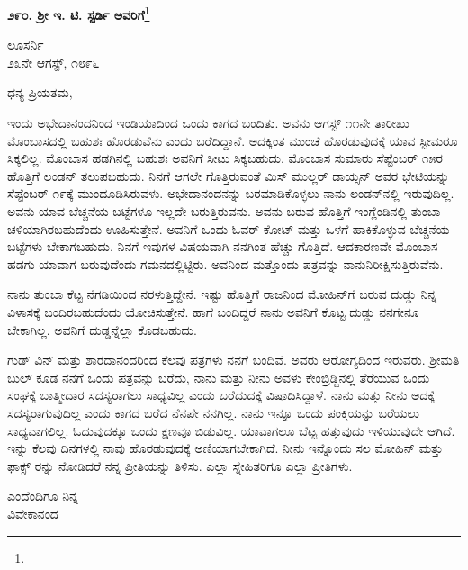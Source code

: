\begin{center}
\textbf{೨೯೦. ಶ‍್ರೀ ಇ. ಟಿ. ಸ್ಟರ್ಡಿ ಅವರಿಗೆ}\footnote{}
\end{center}


\vspace{-0.5cm}

\begin{flushright}
ಲೂಸರ್ನಿ\\೨೩ನೇ ಆಗಸ್ಟ್, ೧೮೯೬
\end{flushright}

\vspace{-0.45cm}

\noindent
ಧನ್ಯ ಪ್ರಿಯತಮ,

ಇಂದು ಅಭೇದಾನಂದನಿಂದ ಇಂಡಿಯಾದಿಂದ ಒಂದು ಕಾಗದ ಬಂದಿತು. ಅವನು ಆಗಸ್ಟ್ ೧೧ನೇ ತಾರೀಖು  ಮೊಂಬಾಸದಲ್ಲಿ ಬಹುಶಃ ಹೊರಡುವೆನು ಎಂದು ಬರೆದಿದ್ದಾನೆ. ಅದಕ್ಕಿಂತ ಮುಂಚೆ ಹೊರಡುವುದಕ್ಕೆ ಯಾವ ಸ್ಟೀಮರೂ ಸಿಕ್ಕಲಿಲ್ಲ. ಮೊಂಬಾಸ ಹಡಗಿನಲ್ಲಿ ಬಹುಶಃ ಅವನಿಗೆ ಸೀಟು ಸಿಕ್ಕಬಹುದು. ಮೊಂಬಾಸ ಸುಮಾರು ಸೆಪ್ಟೆಂಬರ್ ೧೫ರ ಹೊತ್ತಿಗೆ ಲಂಡನ್ ತಲುಪಬಹುದು. ನಿನಗೆ ಆಗಲೇ ಗೊತ್ತಿರುವಂತೆ ಮಿಸ್ ಮುಲ್ಲರ್ ಡಾಯ್ಸನ್ ಅವರ ಭೇಟಿಯನ್ನು ಸೆಪ್ಟೆಂಬರ್ ೧೯ಕ್ಕೆ ಮುಂದೂಡಿಸಿರುವಳು. ಅಭೇದಾನಂದನನ್ನು ಬರಮಾಡಿಕೊಳ್ಳಲು ನಾನು ಲಂಡನ್‌ನಲ್ಲಿ ಇರುವುದಿಲ್ಲ. ಅವನು ಯಾವ ಬೆಚ್ಚನೆಯ ಬಟ್ಟೆಗಳೂ ಇಲ್ಲದೇ ಬರುತ್ತಿರುವನು. ಅವನು ಬರುವ ಹೊತ್ತಿಗೆ ಇಂಗ್ಲೆಂಡಿನಲ್ಲಿ ತುಂಬಾ ಚಳಿಯಾಗಿರಬಹುದೆಂದು ಊಹಿಸುತ್ತೇನೆ. ಅವನಿಗೆ ಒಂದು ಓವರ್ ಕೋಟ್ ಮತ್ತು ಒಳಗೆ ಹಾಕಿಕೊಳ್ಳುವ ಬೆಚ್ಚನೆಯ ಬಟ್ಟೆಗಳು ಬೇಕಾಗಬಹುದು. ನಿನಗೆ ಇವುಗಳ ವಿಷಯವಾಗಿ ನನಗಿಂತ ಹೆಚ್ಚು ಗೊತ್ತಿದೆ. ಆದಕಾರಣವೇ ಮೊಂಬಾಸ ಹಡಗು ಯಾವಾಗ ಬರುವುದೆಂದು ಗಮನದಲ್ಲಿಟ್ಟಿರು. ಅವನಿಂದ ಮತ್ತೊಂದು ಪತ್ರವನ್ನು ನಾನುನಿರೀಕ್ಷಿಸುತ್ತಿರುವೆನು.

ನಾನು ತುಂಬಾ ಕೆಟ್ಟ ನೆಗಡಿಯಿಂದ ನರಳುತ್ತಿದ್ದೇನೆ. ಇಷ್ಟು ಹೊತ್ತಿಗೆ ರಾಜನಿಂದ ಮೋಹಿನ್‌ಗೆ ಬರುವ ದುಡ್ಡು ನಿನ್ನ ವಿಳಾಸಕ್ಕೆ ಬಂದಿರಬಹುದೆಂದು ಯೋಚಿಸುತ್ತೇನೆ. ಹಾಗೆ ಬಂದಿದ್ದರೆ ನಾನು ಅವನಿಗೆ ಕೊಟ್ಟ ದುಡ್ಡು ನನಗೇನೂ ಬೇಕಾಗಿಲ್ಲ. ಅವನಿಗೆ ದುಡ್ಡನ್ನೆಲ್ಲಾ ಕೊಡಬಹುದು.

ಗುಡ್ ವಿನ್ ಮತ್ತು ಶಾರದಾನಂದರಿಂದ ಕೆಲವು ಪತ್ರಗಳು ನನಗೆ ಬಂದಿವೆ. ಅವರು ಆರೋಗ್ಯದಿಂದ ಇರುವರು. ಶ‍್ರೀಮತಿ ಬುಲ್ ಕೂಡ ನನಗೆ ಒಂದು ಪತ್ರವನ್ನು ಬರೆದು, ನಾನು ಮತ್ತು ನೀನು ಅವಳು ಕೇಂಬ್ರಿಡ್ಜಿನಲ್ಲಿ ತೆರೆಯುವ ಒಂದು ಸಂಘಕ್ಕೆ ಬಾತ್ಮೀದಾರ ಸದಸ್ಯರಾಗಲು ಸಾಧ್ಯವಿಲ್ಲ ಎಂದು ಬರೆದುದಕ್ಕೆ ವಿಷಾದಿಸಿದ್ದಾಳೆ. ನಾನು ಮತ್ತು ನೀನು ಅದಕ್ಕೆ ಸದಸ್ಯರಾಗುವುದಿಲ್ಲ ಎಂದು ಕಾಗದ ಬರೆದ ನೆನಪೇ ನನಗಿಲ್ಲ. ನಾನು ಇನ್ನೂ ಒಂದು ಪಂಕ್ತಿಯನ್ನು ಬರೆಯಲು ಸಾಧ್ಯವಾಗಲಿಲ್ಲ. ಓದುವುದಕ್ಕೂ ಒಂದು ಕ್ಷಣವೂ ಬಿಡುವಿಲ್ಲ. ಯಾವಾಗಲೂ ಬೆಟ್ಟ ಹತ್ತುವುದು ಇಳಿಯುವುದೇ ಆಗಿದೆ. ಇನ್ನು ಕೆಲವು ದಿನಗಳಲ್ಲಿ ನಾವು ಹೊರಡುವುದಕ್ಕೆ ಅಣಿಯಾಗಬೇಕಾಗಿದೆ. ನೀನು ಇನ್ನೊಂದು ಸಲ ಮೋಹಿನ್ ಮತ್ತು ಫಾಕ್ಸ್ ರನ್ನು ನೋಡಿದರೆ ನನ್ನ ಪ್ರೀತಿಯನ್ನು ತಿಳಿಸು. ಎಲ್ಲಾ ಸ್ನೇಹಿತರಿಗೂ ಎಲ್ಲಾ ಪ್ರೀತಿಗಳು.

\vspace{-0.4cm}

{\flushright
ಎಂದೆಂದಿಗೂ ನಿನ್ನ\\ವಿವೇಕಾನಂದ\par}

